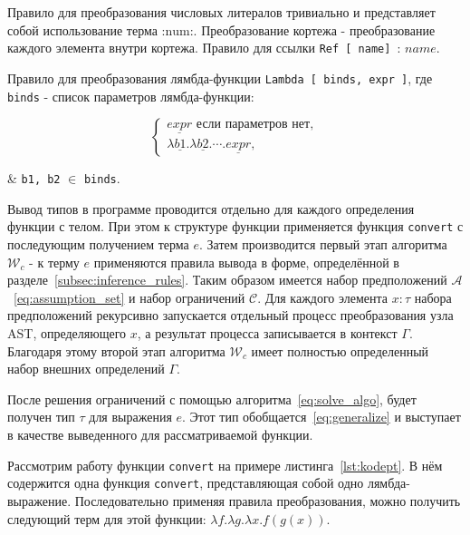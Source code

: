 Правило для преобразования числовых литералов тривиально и представляет собой использование терма $\text{:num:}$.
Преобразование кортежа - преобразование каждого элемента внутри кортежа.
Правило для ссылки \lstinline{Ref [ name] }: $name$.

Правило для преобразования лямбда-функции \lstinline{Lambda [ binds, expr ]}, где \lstinline{binds} - список параметров лямбда-функции:

\begin{equation}
    \label{eq:conv_lambda}
    \begin{cases}
        \underline{expr} \text{ если параметров нет}, \\
        \lambda \underline{b1}. \lambda \underline{b2}. \cdots. \underline{expr},
    \end{cases}
\end{equation}
\begin{eqrem}
    & \texttt{b1, b2} $\in$ \texttt{binds}.
\end{eqrem}

Вывод типов в программе проводится отдельно для каждого определения функции с телом.
При этом к структуре функции применяется функция \lstinline{convert} с последующим получением терма $e$.
Затем производится первый этап алгоритма $\mathcal{W}_c$ - к терму $e$ применяются правила вывода в форме, определённой в разделе~\ref{subsec:inference_rules}.
Таким образом имеется набор предположений $\mathcal{A}$~\eqref{eq:assumption_set} и набор ограничений $\mathcal{C}$.
Для каждого элемента $x: \tau$ набора предположений рекурсивно запускается отдельный процесс преобразования узла AST, определяющего $x$, а результат процесса записывается в контекст $\Gamma$.
Благодаря этому второй этап алгоритма $\mathcal{W}_c$ имеет полностью определенный набор внешних определений $\Gamma$.

После решения ограничений с помощью алгоритма~\ref{eq:solve_algo}, будет получен тип $\tau$ для выражения $e$.
Этот тип обобщается~\eqref{eq:generalize} и выступает в качестве выведенного для рассматриваемой функции.

Рассмотрим работу функции \lstinline{convert} на примере листинга~\ref{lst:kodept}.
В нём содержится одна функция \lstinline{convert}, представляющая собой одно лямбда-выражение.
Последовательно применяя правила преобразования, можно получить следующий терм для этой функции: $\lambda f. \lambda g. \lambda x. f(g(x))$.


